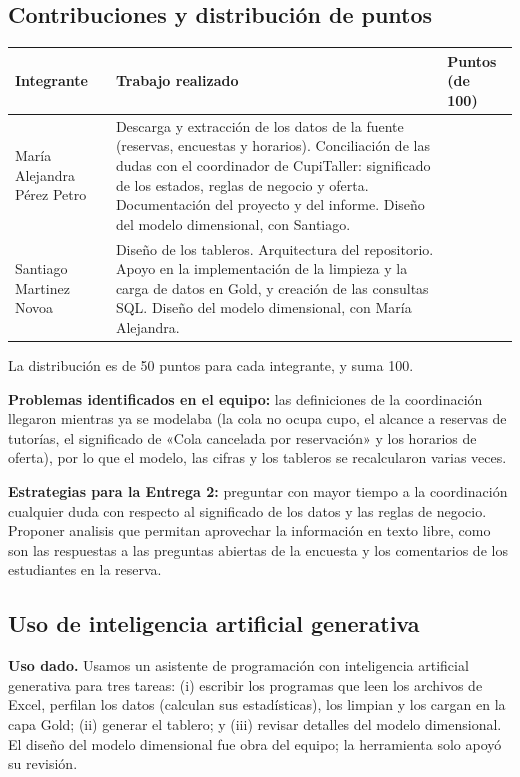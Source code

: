 \documentclass[11pt,letterpaper]{article}
\begin{document}
\subsection{Contribuciones y distribución de puntos}

\begingroup
\small
\setlength{\tabcolsep}{4pt}
\renewcommand{\arraystretch}{1.15}

\begin{longtable}{
>{\raggedright\arraybackslash}p{}
>{\raggedright\arraybackslash}p{}
>{\raggedleft\arraybackslash}p{}
}
\toprule
\textbf{Integrante} &
\textbf{Trabajo realizado} &
\textbf{Puntos (de 100)} \\
\midrule
\endhead

María Alejandra Pérez Petro &
Descarga y extracción de los datos de la fuente (reservas, encuestas y horarios). Conciliación de las dudas con el coordinador de CupiTaller: significado de los estados, reglas de negocio y oferta. Documentación del proyecto y del informe. Diseño del modelo dimensional, con Santiago. &
50 \\

Santiago Martinez Novoa &
Diseño de los tableros. Arquitectura del repositorio. Apoyo en la implementación de la limpieza y la carga de datos en Gold, y creación de las consultas SQL. Diseño del modelo dimensional, con María Alejandra. &
50 \\

\bottomrule
\end{longtable}
\endgroup

La distribución es de 50 puntos para cada integrante, y suma 100. 

\textbf{Problemas identificados en el equipo:} las definiciones de la coordinación llegaron mientras ya se modelaba (la cola no ocupa cupo, el alcance a reservas de tutorías, el significado de «Cola cancelada por reservación» y los horarios de oferta), por lo que el modelo, las cifras y los tableros se recalcularon varias veces.

\textbf{Estrategias para la Entrega 2:} preguntar con mayor tiempo a la coordinación cualquier duda con respecto al significado de los datos y las reglas de negocio. Proponer analisis que permitan aprovechar la información en texto libre, como son las respuestas a las preguntas abiertas de la encuesta y los comentarios de los estudiantes en la reserva.
\subsection{Uso de inteligencia artificial generativa}

\textbf{Uso dado.} Usamos un asistente de programación con inteligencia artificial generativa para tres tareas: (i) escribir los programas que leen los archivos de Excel, perfilan los datos (calculan sus estadísticas), los limpian y los cargan en la capa Gold; (ii) generar el tablero; y (iii) revisar detalles del modelo dimensional. El diseño del modelo dimensional fue obra del equipo; la herramienta solo apoyó su revisión.
\end{document}
